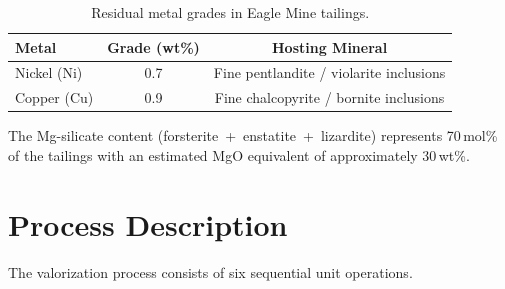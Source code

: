 \documentclass[11pt,a4paper]{article}
\begin{document}
\begin{table}[H]
\centering
\caption{Residual metal grades in Eagle Mine tailings.}
\label{tab:metals}
\begin{tabular}{@{}lcc@{}}
\toprule
\textbf{Metal} & \textbf{Grade (wt\%)} & \textbf{Hosting Mineral} \\
\midrule
Nickel (Ni)  & 0.7 & Fine pentlandite / violarite inclusions \\
Copper (Cu)  & 0.9 & Fine chalcopyrite / bornite inclusions \\
\bottomrule
\end{tabular}
\end{table}

The Mg-silicate content (forsterite~+~enstatite~+~lizardite) represents
70\,mol\% of the tailings with an estimated MgO equivalent of
approximately 30\,wt\%.

\section{Process Description}
\label{sec:process}

The valorization process consists of six sequential unit operations.
\end{document}
